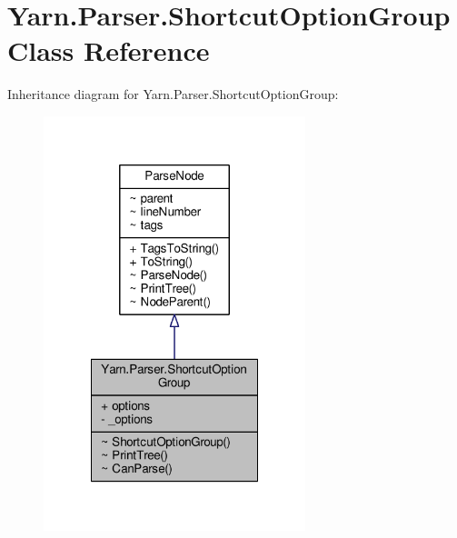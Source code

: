 \hypertarget{a00160}{\section{Yarn.\-Parser.\-Shortcut\-Option\-Group Class Reference}
\label{a00160}
}


Inheritance diagram for Yarn.\-Parser.\-Shortcut\-Option\-Group\-:
\nopagebreak
\begin{figure}[H]
\begin{center}
\leavevmode
\includegraphics[width=216pt]{a00703}
\end{center}
\end{figure}


